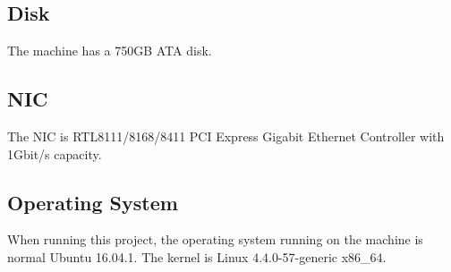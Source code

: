 \subsection{Disk}
The machine has a 750GB ATA disk.

\subsection{NIC}

The NIC is RTL8111/8168/8411 PCI Express Gigabit Ethernet Controller with 1Gbit/s capacity.

\subsection{Operating System}
When running this project, the operating system running on the machine is normal Ubuntu 16.04.1. The kernel is Linux 4.4.0-57-generic x86\_64.
